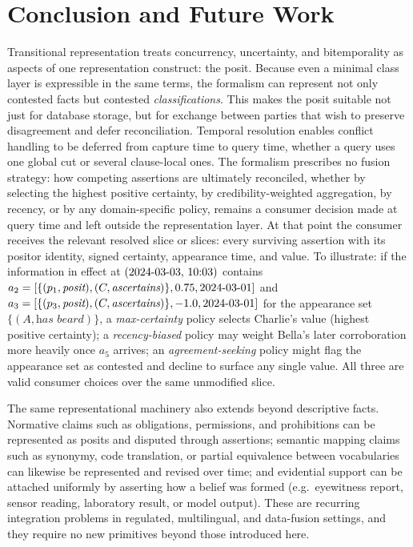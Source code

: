 \documentclass[a4paper,fleqn]{cas-sc}
\begin{document}
\section{Conclusion and Future Work}
Transitional representation treats concurrency, uncertainty, and bitemporality as aspects of one representation construct: the posit. Because even a minimal class layer is expressible in the same terms, the formalism can represent not only contested facts but contested \emph{classifications}. This makes the posit suitable not just for database storage, but for exchange between parties that wish to preserve disagreement and defer reconciliation. Temporal resolution enables conflict handling to be deferred from capture time to query time, whether a query uses one global cut or several clause-local ones. The formalism prescribes no fusion strategy: how competing assertions are ultimately reconciled, whether by selecting the highest positive certainty, by credibility-weighted aggregation, by recency, or by any domain-specific policy, remains a consumer decision made at query time and left outside the representation layer. At that point the consumer receives the relevant resolved slice or slices: every surviving assertion with its positor identity, signed certainty, appearance time, and value. To illustrate: if the information in effect at \((\textrm{2024\text{-}03\text{-}03},\,10{:}03)\) contains \(a_2=[\{(p_1,\textit{posit}),(C,\textit{ascertains})\},0.75,\textrm{2024\text{-}03\text{-}01}]\) and \(a_3=[\{(p_3,\textit{posit}),(C,\textit{ascertains})\},-1.0,\textrm{2024\text{-}03\text{-}01}]\) for the appearance set \(\{(A,\textit{has beard})\}\), a \emph{max-certainty} policy selects Charlie's value (highest positive certainty); a \emph{recency-biased} policy may weight Bella's later corroboration more heavily once \(a_5\) arrives; an \emph{agreement-seeking} policy might flag the appearance set as contested and decline to surface any single value. All three are valid consumer choices over the same unmodified slice.

The same representational machinery also extends beyond descriptive facts. Normative claims such as obligations, permissions, and prohibitions can be represented as posits and disputed through assertions; semantic mapping claims such as synonymy, code translation, or partial equivalence between vocabularies can likewise be represented and revised over time; and evidential support can be attached uniformly by asserting how a belief was formed (e.g.\ eyewitness report, sensor reading, laboratory result, or model output). These are recurring integration problems in regulated, multilingual, and data-fusion settings, and they require no new primitives beyond those introduced here.
\end{document}
